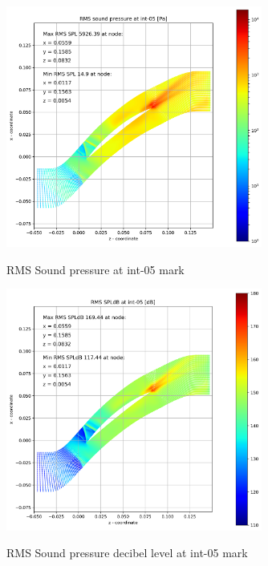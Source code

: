\begin{figure}[ht]
  \centering
  \includegraphics[width=0.75\textwidth]{Figures/int-05-rms-spl.png} \label{int-05-rms-spl}
  \caption{RMS Sound pressure at int-05 mark}
  
  \vspace*{\floatsep}%

  \includegraphics[width=0.75\textwidth]{Figures/int-05-rms-spldb.png} \label{int-05-rms-spldb}
  \caption{RMS Sound pressure decibel level at int-05 mark}
\end{figure}
